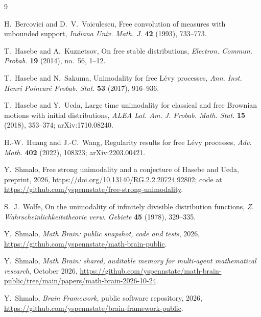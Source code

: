 \documentclass[11pt]{amsart}
\theoremstyle{definition}
\theoremstyle{remark}
\numberwithin{equation}{section}
\begin{document}
\begin{thebibliography}{9}

H.~Bercovici and D.~V.~Voiculescu, Free convolution of measures with unbounded support, \emph{Indiana Univ. Math. J.} \textbf{42} (1993), 733--773.

T.~Hasebe and A.~Kuznetsov, On free stable distributions, \emph{Electron. Commun. Probab.} \textbf{19} (2014), no.~56, 1--12.

T.~Hasebe and N.~Sakuma, Unimodality for free L\'evy processes, \emph{Ann. Inst. Henri Poincar\'e Probab. Stat.} \textbf{53} (2017), 916--936.

T.~Hasebe and Y.~Ueda, Large time unimodality for classical and free Brownian motions with initial distributions, \emph{ALEA Lat. Am. J. Probab. Math. Stat.} \textbf{15} (2018), 353--374; arXiv:1710.08240.

H.-W.~Huang and J.-C.~Wang, Regularity results for free L\'evy processes, \emph{Adv. Math.} \textbf{402} (2022), 108323; arXiv:2203.00421.

Y.~Shmalo, Free strong unimodality and a conjecture of Hasebe and Ueda, preprint, 2026, \url{https://doi.org/10.13140/RG.2.2.20724.92802}; code at \url{https://github.com/yspennstate/free-strong-unimodality}.

S.~J.~Wolfe, On the unimodality of infinitely divisible distribution functions, \emph{Z. Wahrscheinlichkeitstheorie verw. Gebiete} \textbf{45} (1978), 329--335.

 Y.~Shmalo, \emph{Math Brain: public snapshot, code and tests}, 2026, \url{https://github.com/yspennstate/math-brain-public}.

 Y.~Shmalo, \emph{Math Brain: shared, auditable memory for multi-agent mathematical research}, October 2026, \url{https://github.com/yspennstate/math-brain-public/tree/main/papers/math-brain-2026-10-24}.

 Y.~Shmalo, \emph{Brain Framework}, public software repository, 2026, \url{https://github.com/yspennstate/brain-framework-public}.

\end{thebibliography}
\end{document}
